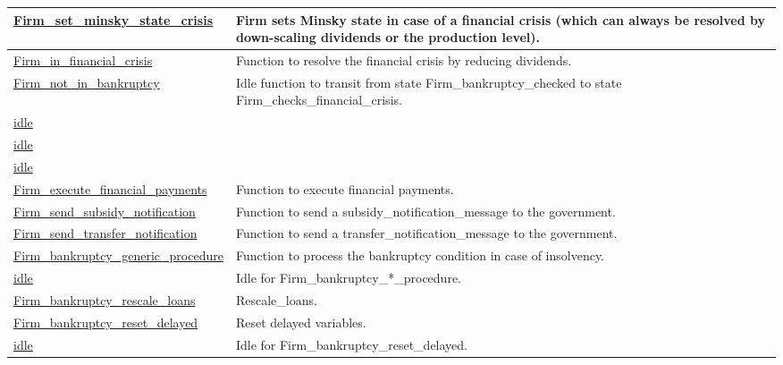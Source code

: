 \documentclass[a4paper,11pt]{article}
\begin{document}
\begin{longtable}[H!]{ll}
\midrule
\parbox{5cm}{\url{Firm_set_minsky_state_crisis}}  & \parbox{10cm}{Firm sets Minsky state in case of a financial crisis (which can always be resolved by down-scaling dividends or the production level).} \\
\midrule
\parbox{5cm}{\url{Firm_in_financial_crisis}}  & \parbox{10cm}{Function to resolve the financial crisis by reducing dividends.} \\
\midrule
\parbox{5cm}{\url{Firm_not_in_bankruptcy}}  & \parbox{10cm}{Idle function to transit from state Firm\_bankruptcy\_checked to state Firm\_checks\_financial\_crisis.} \\
\midrule
\parbox{5cm}{\url{idle}}  & \parbox{10cm}{} \\
\midrule
\parbox{5cm}{\url{idle}}  & \parbox{10cm}{} \\
\midrule
\parbox{5cm}{\url{idle}}  & \parbox{10cm}{} \\
\midrule
\parbox{5cm}{\url{Firm_execute_financial_payments}}  & \parbox{10cm}{Function to execute financial payments.} \\
\midrule
\parbox{5cm}{\url{Firm_send_subsidy_notification}}  & \parbox{10cm}{Function to send a subsidy\_notification\_message to the government.} \\
\midrule
\parbox{5cm}{\url{Firm_send_transfer_notification}}  & \parbox{10cm}{Function to send a transfer\_notification\_message to the government.} \\
\midrule
\parbox{5cm}{\url{Firm_bankruptcy_generic_procedure}}  & \parbox{10cm}{Function to process the bankruptcy condition in case of insolvency.} \\
\midrule
\parbox{5cm}{\url{idle}}  & \parbox{10cm}{Idle for Firm\_bankruptcy\_*\_procedure.
} \\
\midrule
\parbox{5cm}{\url{Firm_bankruptcy_rescale_loans}}  & \parbox{10cm}{Rescale\_loans.} \\
\midrule
\parbox{5cm}{\url{Firm_bankruptcy_reset_delayed}}  & \parbox{10cm}{Reset delayed variables.} \\
\midrule
\parbox{5cm}{\url{idle}}  & \parbox{10cm}{Idle for Firm\_bankruptcy\_reset\_delayed.} \\

\end{longtable}
\end{document}
